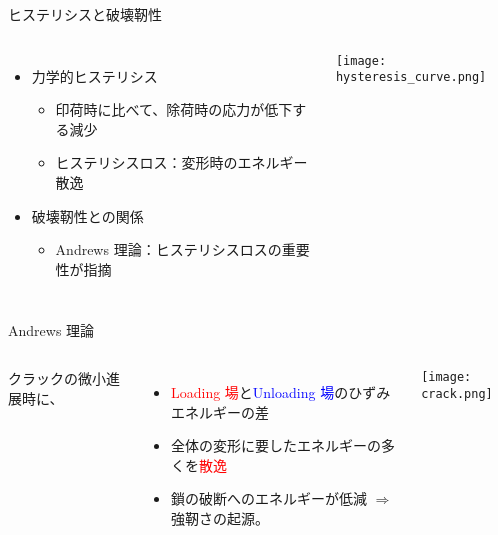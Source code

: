 \begin{columns}[totalwidth=.9\linewidth]
    \column{\textwidth}
    \begin{itembox}[l]{ヒステリシスと破壊靭性}
        \begin{columns}[totalwidth=\linewidth]
                \begin{itemize}
                    \item 力学的ヒステリシス
                    \begin{itemize}
                        \item
                        印荷時に比べて、除荷時の応力が低下する減少
                        \item
                        ヒステリシスロス：変形時のエネルギー散逸
                    \end{itemize}
                    \item 破壊靭性との関係
                    \begin{itemize}
                        \item
                        Andrews 理論：ヒステリシスロスの重要性が指摘
                    \end{itemize}
                \end{itemize}
                \centering
                \texttt{[image: hysteresis\_curve.png]}
            \end{columns}
    \end{itembox}
\end{columns}

\begin{columns}[totalwidth=.9\linewidth]
    \column{\textwidth}
    \begin{itembox}[l]{Andrews 理論\cite{andrews}}
        \begin{columns}[totalwidth=\textwidth]
                クラックの微小進展時に、
                \begin{itemize}
                    \item
                    \textcolor{red}{Loading 場}と\textcolor{blue}{Unloading 場}のひずみエネルギーの差
                    \item
                    全体の変形に要したエネルギーの多くを\textcolor{red}{散逸}
                    \item
                    鎖の破断へのエネルギーが低減 $\Rightarrow$ \alert{強靭さの起源。}
                \end{itemize}	
                \texttt{[image: crack.png]}     
        \end{columns}
    \end{itembox}
\end{columns}

